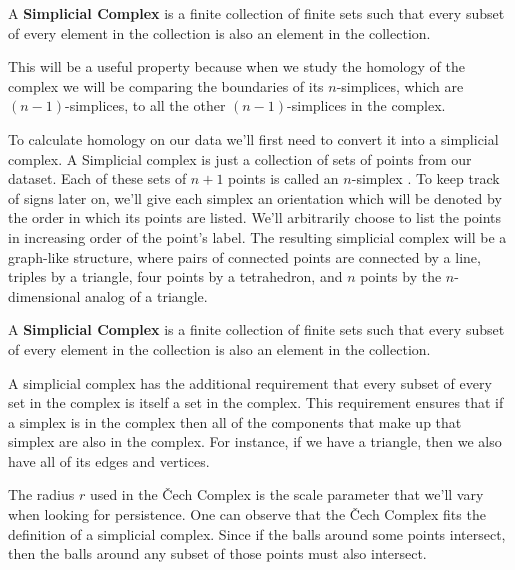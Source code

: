 \begin{definition}\label{def:simplicial-complex}
    A \textbf{Simplicial Complex} is a finite collection of finite sets such that every subset of every element in the collection is also an element in the collection. \cite{wagner}
\end{definition}

This will be a useful property because when we study the homology of the complex we will be comparing the boundaries of its \(n\)-simplices, which are \((n-1)\)-simplices, to all the other \((n-1)\)-simplices in the complex.

To calculate homology on our data we'll first need to convert it into a simplicial complex.
A Simplicial complex is just a collection of sets of points from our dataset. Each of these sets of \(n+1\) points is called an \(n\)-simplex .
To keep track of signs later on, we'll give each simplex an orientation which will be denoted by the order in which its points are listed.
We'll arbitrarily choose to list the points in increasing order of the point's label.
The resulting simplicial complex will be a graph-like structure, where pairs of connected points are connected by a line, triples by a triangle, four points by a tetrahedron, and \(n\) points by the \(n\)-dimensional analog of a triangle.

\begin{definition}\label{def:simplicial-complex}
    A \textbf{Simplicial Complex} is a finite collection of finite sets such that every subset of every element in the collection is also an element in the collection. \cite{wagner}
\end{definition}

A simplicial complex has the additional requirement that every subset of every set in the complex is itself a set in the complex. This requirement ensures that if a simplex is in the complex then all of the components that make up that simplex are also in the complex. For instance, if we have a triangle, then we also have all of its edges and vertices.

\begin{figure}
    
    \caption{}
    \label{fig:basic-simplices}
\end{figure}

The radius \(r\) used in the \v{C}ech Complex is the scale parameter that we'll vary when looking for persistence. One can observe that the \v{C}ech Complex fits the definition of a simplicial complex.
Since if the balls around some points intersect, then the balls around any subset of those points must also intersect.


